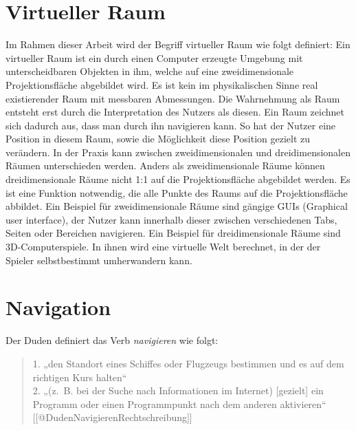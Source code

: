\section{Virtueller Raum}
Im Rahmen dieser Arbeit wird der Begriff virtueller Raum wie folgt definiert:
Ein virtueller Raum ist ein durch einen Computer erzeugte Umgebung mit unterscheidbaren Objekten in ihm, welche auf eine zweidimensionale Projektionsfläche abgebildet wird. Es ist kein im physikalischen Sinne real existierender Raum mit messbaren Abmessungen. Die Wahrnehmung als Raum entsteht erst durch die Interpretation des Nutzers als diesen. Ein Raum zeichnet sich dadurch aus, dass man durch ihn navigieren kann. So hat der Nutzer eine Position in diesem Raum, sowie die Möglichkeit diese Position gezielt zu verändern. In der Praxis kann zwischen zweidimensionalen und dreidimensionalen Räumen unterschieden werden. Anders als zweidimensionale Räume können dreidimensionale Räume nicht 1:1 auf die Projektionsfläche abgebildet werden. Es ist eine Funktion notwendig, die alle Punkte des Raums auf die Projektionsfläche abbildet. Ein Beispiel für zweidimensionale Räume sind gängige GUIs (Graphical user interface), der Nutzer kann innerhalb dieser zwischen verschiedenen Tabs, Seiten oder Bereichen navigieren. Ein Beispiel für dreidimensionale Räume sind 3D-Computerspiele. In ihnen wird eine virtuelle Welt berechnet, in der der Spieler selbstbestimmt umherwandern kann.

\section{Navigation}
Der Duden definiert das Verb \textit{navigieren} wie folgt:

\begin{quote}
    1. „den Standort eines Schiffes oder Flugzeugs bestimmen und es auf dem richtigen Kurs halten“\\
    2. „(z. B. bei der Suche nach Informationen im Internet) [gezielt] ein Programm oder einen Programmpunkt nach dem anderen aktivieren“
    [[@DudenNavigierenRechtschreibung]]
\end{quote}

